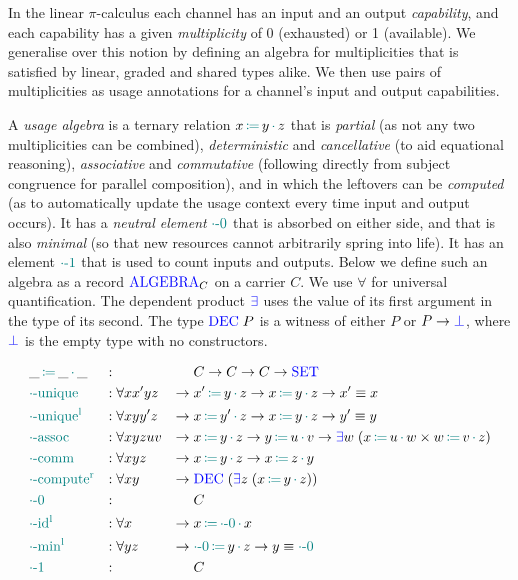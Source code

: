 \documentclass[runningheads]{llncs}
\newcommand{\picalc}{$\pi$-calculus}
\newcommand{\type}[1]{\textcolor{blue}{\operatorname{#1}}}
\newcommand{\func}[1]{\textcolor{teal}{\operatorname{#1}}}
\newcommand{\op}[3]{#1 \, \func{\coloneqq} \, #2 \, \func{\cdot} \, #3}
\newcommand{\zero}{\func{\cdot-0}}
\newcommand{\one}{\func{\cdot-1}}
\newcommand{\Set}{\type{SET}}
\newcommand{\Algebra}{\type{ALGEBRA}}
\begin{document}
In the linear \picalc{} each channel has an input and an output \emph{capability}, and each capability has a given \emph{multiplicity} of 0 (exhausted) or 1 (available).
We generalise over this notion by defining an algebra for multiplicities that is satisfied by linear, graded and shared types alike.
We then use pairs of multiplicities as usage annotations for a channel's input and output capabilities.

\begin{nidefinition}
  A \emph{usage algebra} is a ternary relation $\op{x}{y}{z}$ that is \emph{partial} (as not any two multiplicities can be combined), \emph{deterministic} and \emph{cancellative} (to aid equational reasoning), \emph{associative} and \emph{commutative} (following directly from subject congruence for parallel composition), and in which the leftovers can be \emph{computed} (as to automatically update the usage context every time input and output occurs).
  It has a \emph{neutral element} $\zero$ that is absorbed on either side, and that is also \emph{minimal} (so that new resources cannot arbitrarily spring into life).
  It has an element $\one$ that is used to count inputs and outputs.
  Below we define such an algebra as a record $\Algebra_C$ on a carrier $C$.
  We use $\forall$ for universal quantification.
  The dependent product $\type{\exists}$ uses the value of its first argument in the type of its second.
  The type $\type{DEC} \; P$ is a witness of either $P$ or $P \to \type{\bot}$, where $\type{\bot}$ is the empty type with no constructors.

  \begin{equation*}
  \begin{aligned}
    &\op{\_}{\_}{\_}         &:{} &                 &        & C \to C \to C \to \Set \\
    &\func{\cdot-unique}     &:{} &\forall x x' y z  & \to \; & \op{x'}{y}{z} \to \op{x}{y}{z} \to x' \equiv x \\
    &\func{\cdot-unique^l}   &:{} &\forall x y y' z  & \to \; & \op{x}{y'}{z} \to \op{x}{y}{z} \to y' \equiv y \\
    &\func{\cdot-assoc}      &:{} &\forall x y z u v & \to \; & \op{x}{y}{z} \to \op{y}{u}{v} \to \type{\exists} w  \; (\op{x}{u}{w} \times \op{w}{v}{z}) \\
    &\func{\cdot-comm}       &:{} &\forall x y z     & \to \; & \op{x}{y}{z} \to \op{x}{z}{y} \\
    &\func{\cdot-compute^r}  &:{} &\forall x y       & \to \; & \type{DEC} \; (\type{\exists} z  \; (\op{x}{y}{z})) \\
    &\zero                   &:{} &                 &        & C \\
    &\func{\cdot-id^l}       &:{} &\forall x         & \to \; & \op{x}{\zero}{x} \\
    &\func{\cdot-min^l}      &:{} &\forall y z        & \to \; & \op{\zero}{y}{z} \to y \equiv \zero \\
    &\one                    &:{} &                 &        & C \\
  \end{aligned}
  \end{equation*}
\end{nidefinition}
\end{document}
